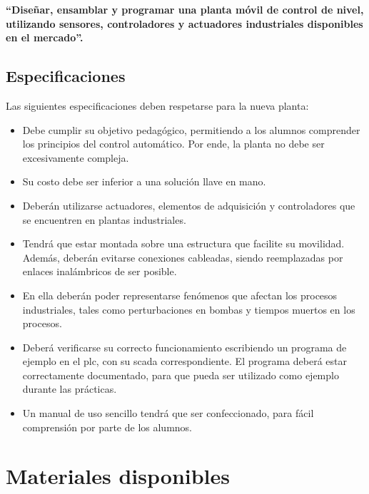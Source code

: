 \textbf{``Diseñar, ensamblar y programar una planta móvil de control de nivel,
utilizando sensores, controladores y actuadores industriales disponibles en el
mercado''.}


\subsection{Especificaciones}
\label{subsec:especificaciones}

Las siguientes especificaciones deben respetarse para la nueva planta:

\begin{itemize}
\item Debe cumplir su objetivo pedagógico, permitiendo
 a los alumnos comprender los principios del control automático.
 Por ende, la planta no debe ser excesivamente compleja.
 \item Su costo debe ser inferior a una solución llave en mano.
 \item Deberán utilizarse actuadores, elementos de adquisición
 y controladores que se encuentren en plantas industriales.
 \item Tendrá que estar montada sobre una estructura que facilite su
movilidad. Además, deberán evitarse conexiones cableadas, siendo reemplazadas
por enlaces inalámbricos de ser posible.
 \item En ella deberán poder representarse fenómenos que
afectan los procesos industriales, tales como perturbaciones en bombas y
tiempos muertos en los procesos.
 \item Deberá verificarse su correcto funcionamiento escribiendo un programa de
ejemplo en el \gls{plc}, con su \gls{scada} correspondiente.
El programa deberá estar correctamente documentado, para que pueda ser
utilizado como ejemplo durante las prácticas.
 \item Un manual de uso sencillo tendrá que ser confeccionado, para
 fácil comprensión por parte de los alumnos.
\end{itemize}

\section{Materiales disponibles}
\label{sec:MaterialesDisponibles}

